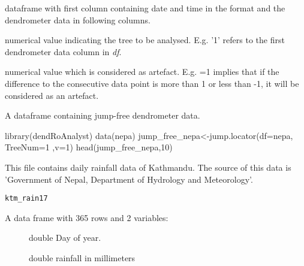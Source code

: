 \documentclass[a4paper]{book}
\begin{document}
%
\begin{Arguments}
\begin{ldescription}
\item[\code{df}] dataframe with first column containing date and time in the format  and the dendrometer data in following columns.

\item[\code{TreeNum}] numerical value indicating the tree to be analysed. E.g. '1' refers to the first dendrometer data column in \emph{df}.

\item[\code{v}] numerical value which is considered as artefact. E.g. =1 implies that if the difference to the consecutive data point is more than 1 or less than -1, it will be considered as an artefact.
\end{ldescription}
\end{Arguments}
%
\begin{Value}
A dataframe containing jump-free dendrometer data.
\end{Value}
%
\begin{Examples}
\begin{ExampleCode}
library(dendRoAnalyst)
data(nepa)
jump_free_nepa<-jump.locator(df=nepa, TreeNum=1 ,v=1)
head(jump_free_nepa,10)

\end{ExampleCode}
\end{Examples}
%
\begin{Description}\relax
This file contains daily rainfall data of Kathmandu. The source of this data is 'Government of Nepal, Department of Hydrology and Meteorology'.
\end{Description}
%
\begin{Usage}
\begin{verbatim}
ktm_rain17
\end{verbatim}
\end{Usage}
%
\begin{Format}
A data frame with 365 rows and 2 variables:
\begin{description}

\item[] double Day of year.
\item[] double rainfall in millimeters

\end{description}

\end{Format}
\end{document}
